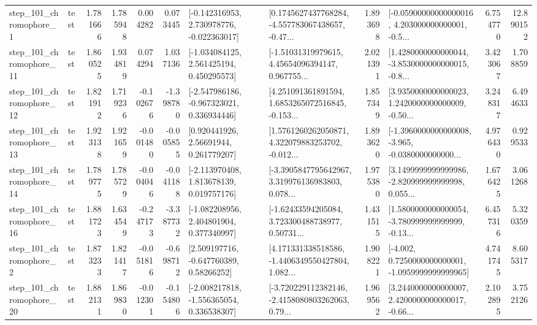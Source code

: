 \begin{tabular}{llrrrrllrlrr}
   step\_101\_chromophore\_1 &      test &      1.781666 &    1.785948 &      0.004282 &  0.073445 &   [-0.142316953, 2.730978776, -0.022363017] &  [0.1745627437768284, -4.557783067438657, -0.47... &       1.893698 &  [-0.05900000000000016, 4.203000000000001, -0.5... &            6.754770 &         12.890152 \\
  step\_101\_chromophore\_11 &      test &      1.860525 &    1.934819 &      0.074294 &  1.037136 &    [-1.034084125, 2.561425194, 0.450295573] &  [-1.51031319979615, 4.45654096394147, 0.967755... &       2.021391 &  [1.4280000000000044, -3.8530000000000015, -0.8... &            3.423067 &          1.708859 \\
  step\_101\_chromophore\_12 &      test &      1.821912 &    1.719236 &     -0.102676 & -1.398780 &   [-2.547986186, -0.967323021, 0.336934446] &  [4.251091361891594, 1.6853265072516845, -0.153... &       1.857349 &  [3.9350000000000023, 1.2420000000000009, -0.50... &            3.248317 &          6.494633 \\
  step\_101\_chromophore\_13 &      test &      1.923138 &    1.921659 &     -0.001480 & -0.005855 &      [0.920441926, 2.56691944, 0.261779207] &  [1.5761260262050871, 4.322079883253702, -0.012... &       1.893620 &  [-1.3960000000000008, -3.965, -0.0380000000000... &            4.976430 &          0.929533 \\
  step\_101\_chromophore\_14 &      test &      1.789775 &    1.785729 &     -0.004046 & -0.041188 &    [-2.113970408, 1.813678139, 0.019757176] &  [-3.3905847795642967, 3.319976136983803, 0.078... &       1.975380 &  [3.1499999999999986, -2.820999999999998, 0.055... &            1.676425 &          3.061268 \\
  step\_101\_chromophore\_16 &      test &      1.881723 &    1.634549 &     -0.247173 & -3.387732 &    [-1.082208956, 2.404801904, 0.377340997] &  [-1.62433594205084, 3.723300488738977, 0.50731... &       1.431515 &  [1.5800000000000054, -3.780999999999999, -0.13... &            6.457316 &          5.320359 \\
   step\_101\_chromophore\_2 &      test &      1.873233 &    1.821417 &     -0.051816 & -0.698712 &     [2.509197716, -0.647760389, 0.58266252] &  [4.171331338518586, -1.4406349550427804, 1.082... &       1.908221 &  [-4.002, 0.7250000000000001, -1.0959999999999965] &            4.741745 &          8.605317 \\
  step\_101\_chromophore\_20 &      test &      1.882131 &    1.869830 &     -0.012301 & -0.154806 &   [-2.008217818, -1.556365054, 0.336538307] &  [-3.720229112382146, -2.4158080803262063, 0.79... &       1.969562 &  [3.2440000000000007, 2.4200000000000017, -0.66... &            2.102895 &          3.752126 \\

\end{tabular}
